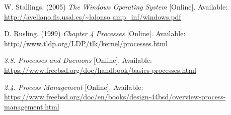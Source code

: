\documentclass[letterpaper,10pt,onecolumn]{report}
\begin{document}
\begin{thebibliography}{4}
W. Stallings. (2005) 
\textit{The Windows Operating System} 
[Online]. Available: 
\\\url{http://avellano.fis.usal.es/~lalonso amp_inf/windows.pdf}

D. Rusling. (1999) 
\textit{Chapter 4 Processes} 
[Online]. Available: 
\\\url{http://www.tldp.org/LDP/tlk/kernel/processes.html}

\textit{3.8. Processes and Daemons} 
[Online]. Available: 
\\\url{https://www.freebsd.org/doc/handbook/basics-processes.html}

\textit{2.4. Process Management} 
[Online]. Available: 
\\\url{https://www.freebsd.org/doc/en/books/design-44bsd/overview-process-management.html}

\end{thebibliography}
\end{document}

